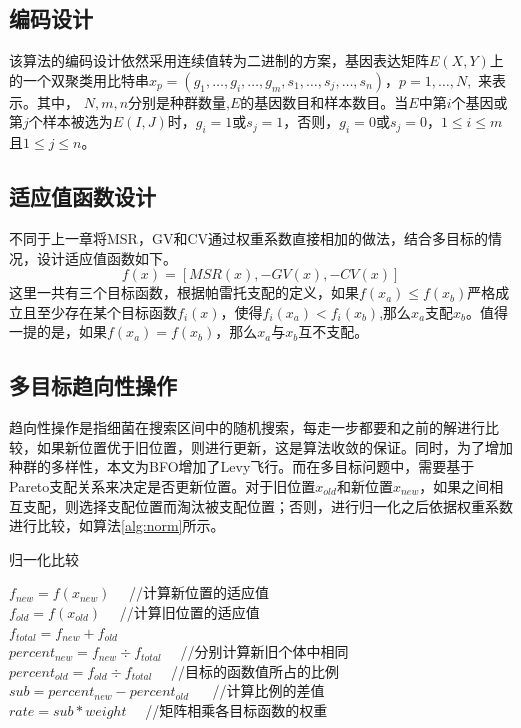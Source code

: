     \subsection{编码设计}
    该算法的编码设计依然采用连续值转为二进制的方案，基因表达矩阵$E(X,Y)$上的一个双聚类用比特串$x_p = (g_1,\dots,g_i,\dots,g_m,s_1,\dots,s_j,\dots,s_n)$，$ p=1,\dots,N, $ 来表示。其中， $N,m,n$分别是种群数量,$E$的基因数目和样本数目。当$E$中第$i$个基因或第$j$个样本被选为$E(I,J)$时，$g_i=1$或$s_j=1$，否则，$g_i=0$或$s_j=0$，$1\le i \le m$ 且$1\le j \le n$。

    \subsection{适应值函数设计}
    不同于上一章将MSR，GV和CV通过权重系数直接相加的做法，结合多目标的情况，设计适应值函数如下。
    \begin{equation}
      f(x) = [MSR(x), -GV(x), -CV(x)]  
    \end{equation}
    这里一共有三个目标函数，根据帕雷托支配的定义，如果$f(x_a)\le f(x_b)$严格成立且至少存在某个目标函数$f_i(x)$，使得$f_i(x_a)<f_i(x_b)$,那么$x_a$支配$x_b$。值得一提的是，如果$f(x_a)= f(x_b)$，那么$x_a$与$x_b$互不支配。
    
    \subsection{多目标趋向性操作}
    趋向性操作是指细菌在搜索区间中的随机搜索，每走一步都要和之前的解进行比较，如果新位置优于旧位置，则进行更新，这是算法收敛的保证。同时，为了增加种群的多样性，本文为BFO增加了Levy飞行。而在多目标问题中，需要基于Pareto支配关系来决定是否更新位置。对于旧位置$x_{old}$和新位置$x_{new}$，如果之间相互支配，则选择支配位置而淘汰被支配位置；否则，进行归一化之后依据权重系数进行比较，如算法\ref{alg:norm}所示。

    \begin{algorithm}[htbp]
    \caption{归一化比较} \label{alg:norm}
    $f_{new} = f(x_{new})$　   //计算新位置的适应值\\
    $f_{old} = f(x_{old})$　 //计算旧位置的适应值\\
    $f_{total} = f_{new} + f_{old}$　   \\
    $percent_{new} = f_{new} \div f_{total}$　 //分别计算新旧个体中相同\\
    $percent_{old} = f_{old} \div f_{total}$　 //目标的函数值所占的比例\\
    $sub = percent_{new} - percent_{old}$ 　 //计算比例的差值\\
    $rate = sub \ast weight$　 //矩阵相乘各目标函数的权重\\
    \end{algorithm}

